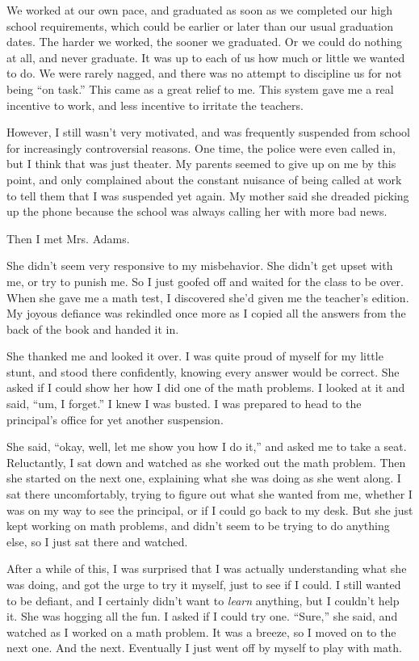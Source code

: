 We worked at our own pace, and graduated as soon as we completed our high school requirements, which could be earlier or later than our usual graduation dates. The harder we worked, the sooner we graduated. Or we could do nothing at all, and never graduate. It was up to each of us how much or little we wanted to do. We were rarely nagged, and there was no attempt to discipline us for not being ``on task.'' This came as a great relief to me. This system gave me a real incentive to work, and less incentive to irritate the teachers.

However, I still wasn't very motivated, and was frequently suspended from school for increasingly controversial reasons. One time, the police were even called in, but I think that was just theater. My parents seemed to give up on me by this point, and only complained about the constant nuisance of being called at work to tell them that I was suspended yet again. My mother said she dreaded picking up the phone because the school was always calling her with more bad news.

Then I met Mrs. Adams.

She didn't seem very responsive to my misbehavior. She didn't get upset with me, or try to punish me. So I just goofed off and waited for the class to be over. When she gave me a math test, I discovered she'd given me the teacher's edition. My joyous defiance was rekindled once more as I copied all the answers from the back of the book and handed it in.

She thanked me and looked it over. I was quite proud of myself for my little stunt, and stood there confidently, knowing every answer would be correct. She asked if I could show her how I did one of the math problems. I looked at it and said, ``um, I forget.'' I knew I was busted. I was prepared to head to the principal's office for yet another suspension.

She said, ``okay, well, let me show you how I do it,'' and asked me to take a seat. Reluctantly, I sat down and watched as she worked out the math problem. Then she started on the next one, explaining what she was doing as she went along. I sat there uncomfortably, trying to figure out what she wanted from me, whether I was on my way to see the principal, or if I could go back to my desk. But she just kept working on math problems, and didn't seem to be trying to do anything else, so I just sat there and watched.

After a while of this, I was surprised that I was actually understanding what she was doing, and got the urge to try it myself, just to see if I could. I still wanted to be defiant, and I certainly didn't want to \emph{learn} anything, but I couldn't help it. She was hogging all the fun. I asked if I could try one. ``Sure,'' she said, and watched as I worked on a math problem. It was a breeze, so I moved on to the next one. And the next. Eventually I just went off by myself to play with math.

